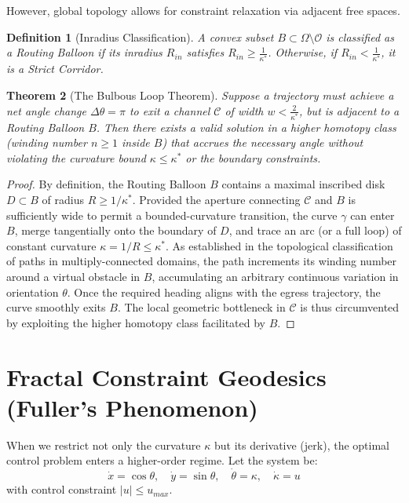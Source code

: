 \documentclass[12pt, a4paper]{article}
\newtheorem{theorem}{Theorem}[section]
\newtheorem{definition}[theorem]{Definition}
\begin{document}
However, global topology allows for constraint relaxation via adjacent free spaces.

\begin{definition}[Inradius Classification]
A convex subset $B \subset \Omega \setminus \mathcal{O}$ is classified as a \emph{Routing Balloon} if its inradius $R_{in}$ satisfies $R_{in} \ge \frac{1}{\kappa^*}$. Otherwise, if $R_{in} < \frac{1}{\kappa^*}$, it is a \emph{Strict Corridor}.
\end{definition}

\begin{theorem}[The Bulbous Loop Theorem]
Suppose a trajectory must achieve a net angle change $\Delta \theta = \pi$ to exit a channel $\mathcal{C}$ of width $w < \frac{2}{\kappa^*}$, but is adjacent to a Routing Balloon $B$. Then there exists a valid solution in a higher homotopy class (winding number $n \ge 1$ inside $B$) that accrues the necessary angle without violating the curvature bound $\kappa \le \kappa^*$ or the boundary constraints.
\end{theorem}
\begin{proof}
By definition, the Routing Balloon $B$ contains a maximal inscribed disk $D \subset B$ of radius $R \ge 1/\kappa^*$. Provided the aperture connecting $\mathcal{C}$ and $B$ is sufficiently wide to permit a bounded-curvature transition, the curve $\gamma$ can enter $B$, merge tangentially onto the boundary of $D$, and trace an arc (or a full loop) of constant curvature $\kappa = 1/R \le \kappa^*$. 
As established in the topological classification of paths in multiply-connected domains, the path increments its winding number around a virtual obstacle in $B$, accumulating an arbitrary continuous variation in orientation $\theta$. Once the required heading aligns with the egress trajectory, the curve smoothly exits $B$. The local geometric bottleneck in $\mathcal{C}$ is thus circumvented by exploiting the higher homotopy class facilitated by $B$.
\end{proof}

\section{Fractal Constraint Geodesics (Fuller's Phenomenon)}

When we restrict not only the curvature $\kappa$ but its derivative (jerk), the optimal control problem enters a higher-order regime. Let the system be:
\begin{equation}
    \dot{x} = \cos \theta, \quad \dot{y} = \sin \theta, \quad \dot{\theta} = \kappa, \quad \dot{\kappa} = u
\end{equation}
with control constraint $|u| \le u_{max}$.
\end{document}
